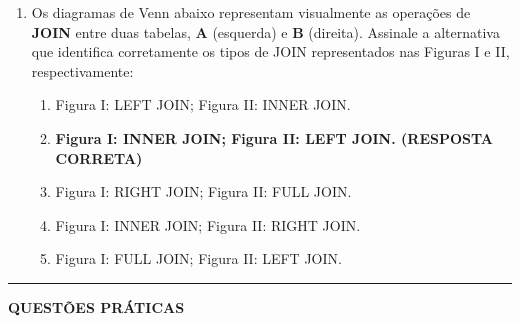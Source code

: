 \documentclass[12pt,a4paper]{article}
\begin{document}
\begin{enumerate}
    \item Os diagramas de Venn abaixo representam visualmente as operações de \textbf{JOIN} entre duas tabelas, \textbf{A} (esquerda) e \textbf{B} (direita). Assinale a alternativa que identifica corretamente os tipos de JOIN representados nas Figuras I e II, respectivamente:

    \begin{center}
        \hspace{2.5cm}
    \end{center}

    \begin{enumerate}[label=\Alph*)]
        \item Figura I: LEFT JOIN; Figura II: INNER JOIN.
        \item \textbf{Figura I: INNER JOIN; Figura II: LEFT JOIN. (RESPOSTA CORRETA)}
        \item Figura I: RIGHT JOIN; Figura II: FULL JOIN.
        \item Figura I: INNER JOIN; Figura II: RIGHT JOIN.
        \item Figura I: FULL JOIN; Figura II: LEFT JOIN.
    \end{enumerate}

\end{enumerate}
\vspace{0.5cm}
\newpage
\begin{center}
    \rule{\textwidth}{0.4pt}
    \textbf{QUESTÕES PRÁTICAS}
\end{center}

\vspace{0.2cm}
\end{document}
